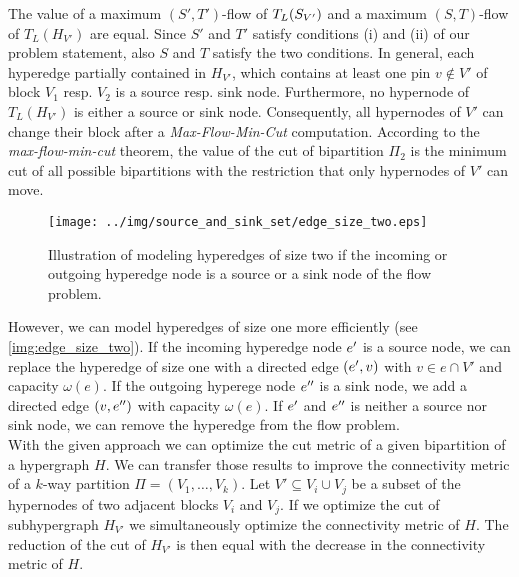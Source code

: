 The value of a maximum $(S',T')$-flow of $T_L(S_{V'})$ and a maximum $(S,T)$-flow
of $T_L(H_{V'})$ are equal. Since $S'$ and $T'$ satisfy conditions (i) and (ii) of our 
problem statement, also $S$ and $T$ satisfy the two conditions. 
In general, each hyperedge partially contained in $H_{V'}$, which contains at least one pin
$v \notin V'$ of block $V_1$ resp. $V_2$ is a source resp. sink node. Furthermore, no hypernode
of $T_L(H_{V'})$ is either a source or sink node. Consequently, all hypernodes of $V'$
can change their block after a \emph{Max-Flow-Min-Cut} computation. According to the 
\emph{max-flow-min-cut} theorem, the value of the cut of bipartition $\Pi_2$ is the minimum
cut of all possible bipartitions with the restriction that only hypernodes of $V'$ can move.\\
\begin{figure}
\centering
\texttt{[image: ../img/source\_and\_sink\_set/edge\_size\_two.eps]}
\caption{Illustration of modeling hyperedges of size two if the incoming or outgoing
         hyperedge node is a source or a sink node of the flow problem.}
\label{img:edge_size_two}
\end{figure}
However, we can model hyperedges of size one more efficiently (see \autoref{img:edge_size_two}).
If the incoming hyperedge node $e'$ is a source node, we can replace the hyperedge of
size one with a directed edge $(e',v)$ with $v \in e \cap V'$ and capacity $\omega(e)$.
If the outgoing hyperege node $e''$ is a sink node, we add a directed edge
$(v,e'')$ with capacity $\omega(e)$. If $e'$ and $e''$ is neither a source
nor sink node, we can remove the hyperedge from the flow problem. \\
With the given approach we can optimize the cut metric of a given
bipartition of a hypergraph $H$. We can transfer those results to improve the connectivity metric
of a $k$-way partition $\Pi = (V_1,\ldots,V_k)$. 
Let $V' \subseteq V_i \cup V_j$ be a subset of the hypernodes of two adjacent
blocks $V_i$ and $V_j$. If we optimize the cut of
subhypergraph $H_{V'}$ we simultaneously optimize the connectivity metric of $H$.
The reduction of the cut of $H_{V'}$ is then equal with the decrease in
the connectivity metric of $H$.

